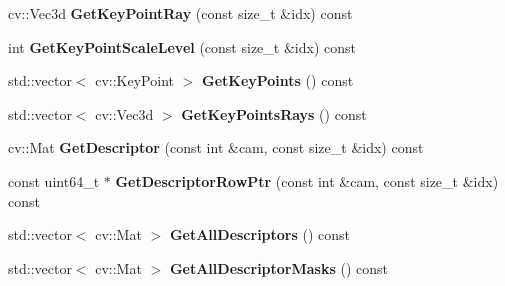 \begin{DoxyCompactItemize}
\item 
cv\+::\+Vec3d {\bfseries Get\+Key\+Point\+Ray} (const size\+\_\+t \&idx) const \hypertarget{classMultiColSLAM_1_1cMultiKeyFrame_ada605837a00ba06dac34d7fcbe98fcd2}{}\label{classMultiColSLAM_1_1cMultiKeyFrame_ada605837a00ba06dac34d7fcbe98fcd2}

\item 
int {\bfseries Get\+Key\+Point\+Scale\+Level} (const size\+\_\+t \&idx) const \hypertarget{classMultiColSLAM_1_1cMultiKeyFrame_a96f62ff22c908e7714f10bb901b24e9f}{}\label{classMultiColSLAM_1_1cMultiKeyFrame_a96f62ff22c908e7714f10bb901b24e9f}

\item 
std\+::vector$<$ cv\+::\+Key\+Point $>$ {\bfseries Get\+Key\+Points} () const \hypertarget{classMultiColSLAM_1_1cMultiKeyFrame_a90964e10f09fde155609e006f6484bb3}{}\label{classMultiColSLAM_1_1cMultiKeyFrame_a90964e10f09fde155609e006f6484bb3}

\item 
std\+::vector$<$ cv\+::\+Vec3d $>$ {\bfseries Get\+Key\+Points\+Rays} () const \hypertarget{classMultiColSLAM_1_1cMultiKeyFrame_aa0ddc6d342cf3057f83871b6d111014c}{}\label{classMultiColSLAM_1_1cMultiKeyFrame_aa0ddc6d342cf3057f83871b6d111014c}

\item 
cv\+::\+Mat {\bfseries Get\+Descriptor} (const int \&cam, const size\+\_\+t \&idx) const \hypertarget{classMultiColSLAM_1_1cMultiKeyFrame_a55512e3e630a9842a451ddb899fa112c}{}\label{classMultiColSLAM_1_1cMultiKeyFrame_a55512e3e630a9842a451ddb899fa112c}

\item 
const uint64\+\_\+t $\ast$ {\bfseries Get\+Descriptor\+Row\+Ptr} (const int \&cam, const size\+\_\+t \&idx) const \hypertarget{classMultiColSLAM_1_1cMultiKeyFrame_aa78e1e92223271e6125ff7285428f71e}{}\label{classMultiColSLAM_1_1cMultiKeyFrame_aa78e1e92223271e6125ff7285428f71e}

\item 
std\+::vector$<$ cv\+::\+Mat $>$ {\bfseries Get\+All\+Descriptors} () const \hypertarget{classMultiColSLAM_1_1cMultiKeyFrame_a2ec6fae136bec1382848396ec45f9e89}{}\label{classMultiColSLAM_1_1cMultiKeyFrame_a2ec6fae136bec1382848396ec45f9e89}

\item 
std\+::vector$<$ cv\+::\+Mat $>$ {\bfseries Get\+All\+Descriptor\+Masks} () const \hypertarget{classMultiColSLAM_1_1cMultiKeyFrame_a37041eddfdadd268c122e1d4c0d73462}{}\label{classMultiColSLAM_1_1cMultiKeyFrame_a37041eddfdadd268c122e1d4c0d73462}


\end{DoxyCompactItemize}
